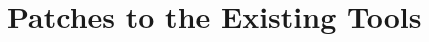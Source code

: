 \documentclass[deska]{subfiles}
\begin{document}
\chapter{Patches to the Existing Tools}
\label{sec:patches}

\begin{abstract}
\end{abstract}
\end{document}
